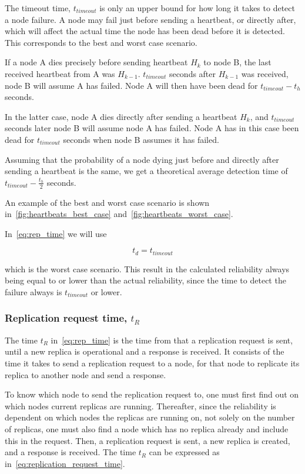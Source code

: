 \documentclass{cslthse-msc}
\begin{document}
The timeout time, $t_{timeout}$ is only an upper bound for how long it takes to detect a node failure. A node may fail just before sending a heartbeat, or directly after, which will affect the actual time the node has been dead before it is detected. This corresponds to the best and worst case scenario. 

If a node A dies precisely before sending heartbeat $H_k$ to node B, the last received heartbeat from A was $H_{k - 1}$. $t_{timeout}$ seconds after $H_{k - 1}$ was received, node B will assume A has failed. Node A will then have been dead for $t_{timeout} - t_h$ seconds.

In the latter case, node A dies directly after sending a heartbeat $H_k$, and $t_{timeout}$ seconds later node B will assume node A has failed. Node A has in this case been dead for $t_{timeout}$ seconds when node B assumes it has failed.

Assuming that the probability of a node dying just before and directly after sending a heartbeat is the same, we get a theoretical average detection time of $t_{timeout} - \frac{t_h}{2}$ seconds. 

An example of the best and worst case scenario is shown in~\cref{fig:heartbeats_best_case} and~\cref{fig:heartbeats_worst_case}.

In~\cref{eq:rep_time} we will use

\begin{equation} \label{eq:node_failure_detection_time}
t_d = t_{timeout}
\end{equation}

which is the worst case scenario. This result in the calculated reliability always being equal to or lower than the actual reliability, since the time to detect the failure always is $t_{timeout}$ or lower.

\subsubsection{Replication request time, $t_R$} \label{sec:replication_time}
The time $t_R$ in~\cref{eq:rep_time} is the time from that a replication request is sent, until a new replica is operational and a response is received. It consists of the time it takes to send a replication request to a node, for that node to replicate its replica to another node and send a response.

To know which node to send the replication request to, one must first find out on which nodes current replicas are running. Thereafter, since the reliability is dependent on which nodes the replicas are running on, not solely on the number of replicas, one must also find a node which has no replica already and include this in the request. Then, a replication request is sent, a new replica is created, and a response is received. The time $t_R$ can be expressed as in~\cref{eq:replication_request_time}.
\end{document}
